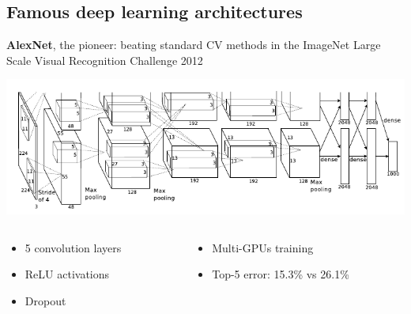 \documentclass[usenames,dvipsnames]{beamer}
\begin{document}
    \subsection[Famous DL architectures]{Famous deep learning architectures}
    \begin{frame}{\secname}{\subsecname}
        \textbf{AlexNet}, the pioneer: beating standard CV methods in the ImageNet Large Scale Visual Recognition Challenge 2012 \cite{krizhevsky2012imagenet}
        \vspace{-0.8em}
        \begin{center}
            \includegraphics[width=0.95\linewidth]{figures/Going_deeper/Alexnet.png}
        \end{center}
        \vspace{-1em}
        \begin{columns}
            \begin{column}{0.4\textwidth}
                \begin{itemize}
                    \item 5 convolution layers
                    \item ReLU activations
                    \item Dropout
                \end{itemize}
            \end{column}
            \begin{column}{0.6\textwidth}
                \begin{itemize}
                    \item Multi-GPUs training
                    \item Top-5 error: 15.3\% vs 26.1\%
                \end{itemize}
            \end{column}
        \end{columns}
    \end{frame}
\end{document}
